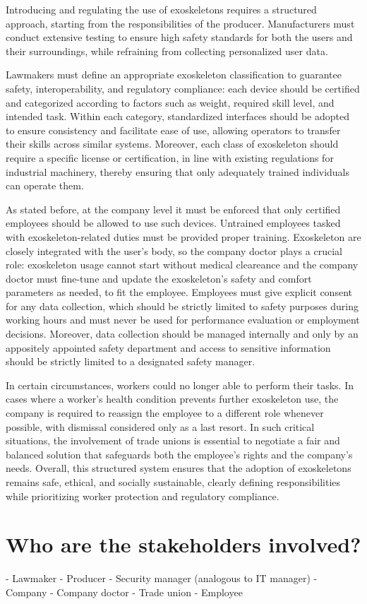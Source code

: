 \documentclass{article}
\begin{document}
Introducing and regulating the use of exoskeletons requires a structured approach, starting from the responsibilities of the producer. 
Manufacturers must conduct extensive testing to ensure high safety standards for both the users and their surroundings, while refraining from collecting personalized user data. 

Lawmakers must define an appropriate exoskeleton classification to guarantee safety, interoperability, and regulatory compliance: each device should be certified and categorized according to factors such as weight, required skill level, and intended task. Within each category, standardized interfaces should be adopted to ensure consistency and facilitate ease of use, allowing operators to transfer their skills across similar systems. Moreover, each class of exoskeleton should require a specific license or certification, in line with existing regulations for industrial machinery, thereby ensuring that only adequately trained individuals can operate them.

As stated before, at the company level it must be enforced that only certified employees should be allowed to use such devices. Untrained employees tasked with exoskeleton-related duties must be provided proper training.
Exoskeleton are closely integrated with the user's body, so the company doctor plays a crucial role: exoskeleton usage cannot start without medical cleareance and the company doctor must fine-tune and update the exoskeleton’s safety and comfort parameters as needed, to fit the employee.
Employees must give explicit consent for any data collection, which should be strictly limited to safety purposes during working hours and must never be used for performance evaluation or employment decisions. 
Moreover, data collection should be managed internally and only by an appositely appointed safety department and access to sensitive information should be strictly limited to a designated safety manager. 

In certain circumstances, workers could no longer able to perform their tasks. In cases where a worker’s health condition prevents further exoskeleton use, the company is required to reassign the employee to a different role whenever possible, with dismissal considered only as a last resort. In such critical situations, the involvement of trade unions is essential to negotiate a fair and balanced solution that safeguards both the employee’s rights and the company’s needs. 
Overall, this structured system ensures that the adoption of exoskeletons remains safe, ethical, and socially sustainable, clearly defining responsibilities while prioritizing worker protection and regulatory compliance.






\section{Who are the stakeholders involved?}
- Lawmaker
- Producer
- Security manager (analogous to IT manager)
- Company
- Company doctor
- Trade union
- Employee
\end{document}
